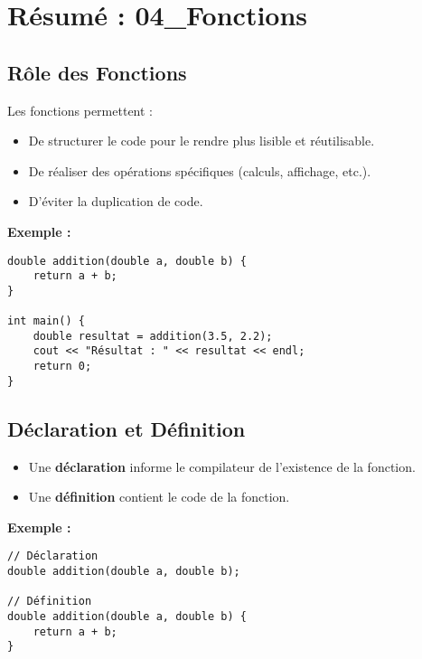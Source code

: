 \section{ Résumé : 04\_Fonctions}

\subsection{ Rôle des Fonctions}
Les fonctions permettent :
\begin{itemize}
    \item De structurer le code pour le rendre plus lisible et réutilisable.
    \item De réaliser des opérations spécifiques (calculs, affichage, etc.).
    \item D'éviter la duplication de code.
\end{itemize}

\textbf{Exemple :}
\begin{tcolorbox}[colframe=blue!50!black, colback=blue!5!white, title=Exemple de Fonction]
\begin{verbatim}
double addition(double a, double b) {
    return a + b;
}

int main() {
    double resultat = addition(3.5, 2.2);
    cout << "Résultat : " << resultat << endl;
    return 0;
}
\end{verbatim}
\end{tcolorbox}

\subsection{ Déclaration et Définition}
\begin{itemize}
    \item Une \textbf{déclaration} informe le compilateur de l'existence de la fonction.
    \item Une \textbf{définition} contient le code de la fonction.
\end{itemize}

\textbf{Exemple :}
\begin{tcolorbox}[colframe=blue!50!black, colback=blue!5!white, title=Exemple de Déclaration et Définition]
\begin{verbatim}
// Déclaration
double addition(double a, double b);

// Définition
double addition(double a, double b) {
    return a + b;
}
\end{verbatim}
\end{tcolorbox}

